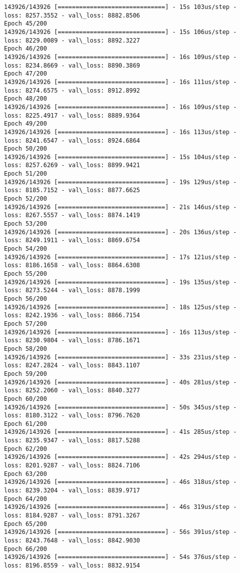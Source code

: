 \documentclass[11pt]{article}
\begin{document}
\begin{Verbatim}[commandchars=\\\{\}]
143926/143926 [==============================] - 15s 103us/step - loss: 8257.3552 - val\_loss: 8882.8506
Epoch 45/200
143926/143926 [==============================] - 15s 106us/step - loss: 8229.0089 - val\_loss: 8892.3227
Epoch 46/200
143926/143926 [==============================] - 16s 109us/step - loss: 8234.8669 - val\_loss: 8890.3869
Epoch 47/200
143926/143926 [==============================] - 16s 111us/step - loss: 8274.6575 - val\_loss: 8912.8992
Epoch 48/200
143926/143926 [==============================] - 16s 109us/step - loss: 8225.4917 - val\_loss: 8889.9364
Epoch 49/200
143926/143926 [==============================] - 16s 113us/step - loss: 8241.6547 - val\_loss: 8924.6864
Epoch 50/200
143926/143926 [==============================] - 15s 104us/step - loss: 8257.6269 - val\_loss: 8899.9421
Epoch 51/200
143926/143926 [==============================] - 19s 129us/step - loss: 8185.7152 - val\_loss: 8877.6625
Epoch 52/200
143926/143926 [==============================] - 21s 146us/step - loss: 8267.5557 - val\_loss: 8874.1419
Epoch 53/200
143926/143926 [==============================] - 20s 136us/step - loss: 8249.1911 - val\_loss: 8869.6754
Epoch 54/200
143926/143926 [==============================] - 17s 121us/step - loss: 8186.1658 - val\_loss: 8864.6308
Epoch 55/200
143926/143926 [==============================] - 19s 135us/step - loss: 8273.5244 - val\_loss: 8878.1999
Epoch 56/200
143926/143926 [==============================] - 18s 125us/step - loss: 8242.1936 - val\_loss: 8866.7154
Epoch 57/200
143926/143926 [==============================] - 16s 113us/step - loss: 8230.9804 - val\_loss: 8786.1671
Epoch 58/200
143926/143926 [==============================] - 33s 231us/step - loss: 8247.2824 - val\_loss: 8843.1107
Epoch 59/200
143926/143926 [==============================] - 40s 281us/step - loss: 8252.2060 - val\_loss: 8840.3277
Epoch 60/200
143926/143926 [==============================] - 50s 345us/step - loss: 8180.3122 - val\_loss: 8796.7620
Epoch 61/200
143926/143926 [==============================] - 41s 285us/step - loss: 8235.9347 - val\_loss: 8817.5288
Epoch 62/200
143926/143926 [==============================] - 42s 294us/step - loss: 8201.9287 - val\_loss: 8824.7106
Epoch 63/200
143926/143926 [==============================] - 46s 318us/step - loss: 8239.3204 - val\_loss: 8839.9717
Epoch 64/200
143926/143926 [==============================] - 46s 319us/step - loss: 8184.9287 - val\_loss: 8791.3267
Epoch 65/200
143926/143926 [==============================] - 56s 391us/step - loss: 8243.7648 - val\_loss: 8842.9030
Epoch 66/200
143926/143926 [==============================] - 54s 376us/step - loss: 8196.8559 - val\_loss: 8832.9154

\end{Verbatim}
\end{document}
